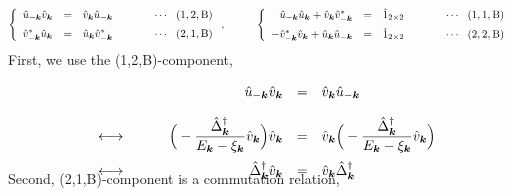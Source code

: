 \documentclass[uplatex,a4j,12pt,dvipdfmx]{jsarticle}
\begin{document}
	\begin{eqnarray}
		\left\{
		\begin{array}{rccl}
			\hat{u}_{-\bm{k}} \hat{v}_{\bm{k}}
			 & =                                      &
			\hat{v}_{\bm{k}} \hat{u}_{-\bm{k}}
			 & \hspace{10mm} \cdots \ \ (1,2,{\rm B})
			\\[2mm]
			\hat{v}_{-\bm{k}}^{*} \hat{u}_{\bm{k}}
			 & =                                      &
			\hat{u}_{\bm{k}} \hat{v}_{-\bm{k}}^{*}
			 & \hspace{10mm} \cdots \ \ (2,1,{\rm B})
		\end{array}
		\right.
		,
		\hspace{10mm}
		\left\{
		\begin{array}{rccl}
			\hat{u}_{-\bm{k}} \hat{u}_{\bm{k}} + \hat{v}_{\bm{k}} \hat{v}_{-\bm{k}}^{*}
			 & =                                      &
			\hat{1}_{2 \times 2}
			 & \hspace{10mm} \cdots \ \ (1,1,{\rm B})
			\\[2mm]
			- \hat{v}_{-\bm{k}}^{*} \hat{v}_{\bm{k}} + \hat{u}_{\bm{k}} \hat{u}_{-\bm{k}}
			 & =                                      &
			\hat{1}_{2 \times 2}
			 & \hspace{10mm} \cdots \ \ (2,2,{\rm B})
		\end{array}
		\right.
	\end{eqnarray}
	First, we use the (1,2,B)-component,

	\begin{eqnarray}
		\begin{array}{rcrcl}
			 &   &
			\hat{u}_{-\bm{k}} \hat{v}_{\bm{k}}
			 & = &
			\hat{v}_{\bm{k}} \hat{u}_{-\bm{k}}
			\nonumber \\[4mm] &\longleftrightarrow& \hspace{8mm}
			\Big( - \dfrac{ \hat{\Delta}^{\dagger}_{\bm{k}} }{ E_{\bm{k}} - \xi_{\bm{k}} } \hat{v}_{\bm{k}} \Big)
			\hat{v}_{\bm{k}}
			 & = &
			\hat{v}_{\bm{k}}
			\Big( - \dfrac{ \hat{\Delta}^{\dagger}_{\bm{k}} }{ E_{\bm{k}} - \xi_{\bm{k}} } \hat{v}_{\bm{k}} \Big)
			\nonumber \\[4mm] &\longleftrightarrow& \hspace{8mm}
			\hat{\Delta}^{\dagger}_{\bm{k}} \hat{v}_{\bm{k}}
			 & = &
			\hat{v}_{\bm{k}} \hat{\Delta}^{\dagger}_{\bm{k}}
		\end{array}
		\\[-5mm]
	\end{eqnarray}
	Second, (2,1,B)-component is a commutation relation,
\end{document}
